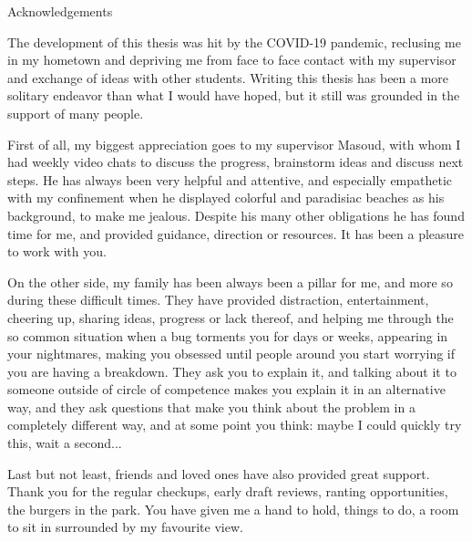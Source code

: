 %
%

\begin{center}
    \huge
    Acknowledgements
    \vspace{1cm}
\end{center}

The development of this thesis was hit by the COVID-19 pandemic, reclusing me in my hometown and depriving me from face to face contact with my supervisor and exchange of ideas with other students. Writing this thesis has been a more solitary endeavor than what I would have hoped, but it still was grounded in the support of many people.

First of all, my biggest appreciation goes to my supervisor Masoud, with whom I had weekly video chats to discuss the progress, brainstorm ideas and discuss next steps. He has always been very helpful and attentive, and especially empathetic with my confinement when he displayed colorful and paradisiac beaches as his background, to make me jealous. Despite his many other obligations he has found time for me, and provided guidance, direction or resources. It has been a pleasure to work with you.

On the other side, my family has been always been a pillar for me, and more so during these difficult times. They have provided distraction, entertainment, cheering up, sharing ideas, progress or lack thereof, and helping me through the so common situation when a bug torments you for days or weeks, appearing in your nightmares, making you obsessed until people around you start worrying if you are having a breakdown. They ask you to explain it, and talking about it to someone outside of circle of competence makes you explain it in an alternative way, and they ask questions that make you think about the problem in a completely different way, and at some point you think: maybe I could quickly try this, wait a second...

Last but not least, friends and loved ones have also provided great support. Thank you for the regular checkups, early draft reviews, ranting opportunities, the burgers in the park. You have given me a hand to hold, things to do, a room to sit in surrounded by my favourite view.

